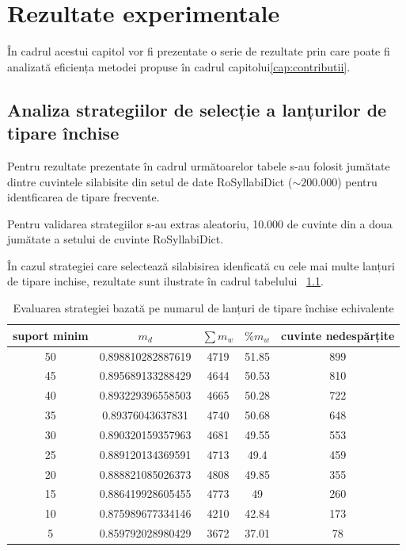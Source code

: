 \chapter{Rezultate experimentale}
\label{cap:rezultate}

În cadrul acestui capitol vor fi prezentate o serie de rezultate prin care poate fi analizată eficiența metodei propuse în cadrul capitolui\ref{cap:contributii}.

\section{Analiza strategiilor de selecție a lanțurilor de tipare închise}

Pentru rezultate prezentate în cadrul următoarelor tabele s-au folosit jumătate dintre cuvintele silabisite din setul de date RoSyllabiDict ($\sim200.000$) pentru identficarea de tipare frecvente. 

Pentru validarea strategiilor s-au extras aleatoriu, 10.000 de cuvinte din a doua jumătate a setului de cuvinte RoSyllabiDict.

În cazul strategiei care selectează silabisirea idenficată cu cele mai multe lanțuri de tipare inchise, rezultate sunt ilustrate în cadrul tabelului ~\ref{table:counting}.

\begin{table}[h!]
\centering
\begin{tabular}{|c|c|c|c|c|}
\hline
suport minim & $m_d$ & $\sum m_w$ & $\%{m_w}$ & cuvinte nedespărțite\\ 
\hline
\hline
50 & 0.898810282887619 & 4719 & 51.85 & 899\\ 
\hline
45 & 0.895689133288429 & 4644 & 50.53 & 810\\ 
\hline
40 & 0.893229396558503 & 4665 & 50.28 & 722\\ 
\hline
35 & 0.89376043637831 & 4740 & 50.68 & 648\\ 
\hline
30 & 0.890320159357963 & 4681 & 49.55 & 553\\ 
\hline
25 & 0.889120134369591 & 4713 & 49.4 & 459\\ 
\hline
20 & 0.888821085026373 & 4808 & 49.85 & 355\\ 
\hline
15 & 0.886419928605455 & 4773 & 49 & 260\\ 
\hline
10 & 0.875989677334146 & 4210 & 42.84 & 173\\ 
\hline
5 & 0.859792028980429 & 3672 & 37.01 & 78\\ 
\hline\end{tabular}
\caption{Evaluarea strategiei bazată pe numarul de lanțuri de tipare închise echivalente} 
\label{table:counting}
\end{table}

